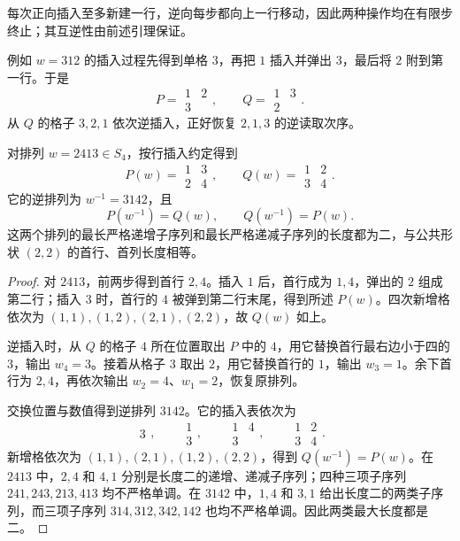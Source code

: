 每次正向插入至多新建一行，逆向每步都向上一行移动，因此两种操作均在有限步终止；其互逆性由前述引理保证。

例如 \(w=312\) 的插入过程先得到单格 \(3\)，再把 \(1\) 插入并弹出 \(3\)，最后将 \(2\) 附到第一行。于是
\[
	P=\begin{array}{cc}1&2\\3&\end{array},
	\qquad
	Q=\begin{array}{cc}1&3\\2&\end{array}.
\]
从 \(Q\) 的格子 \(3,2,1\) 依次逆插入，正好恢复 \(2,1,3\) 的逆读取次序。

\begin{proposition}\label{b5:prop:A-rs-2413}
	对排列 \(w=2413\in S_4\)，按行插入约定得到
	\[
		P(w)=\begin{array}{cc}1&3\\2&4\end{array},
		\qquad
		Q(w)=\begin{array}{cc}1&2\\3&4\end{array}.
	\]
	它的逆排列为 \(w^{-1}=3142\)，且
	\[
		P(w^{-1})=Q(w),\qquad Q(w^{-1})=P(w).
	\]
	这两个排列的最长严格递增子序列和最长严格递减子序列的长度都为二，与公共形状 \((2,2)\) 的首行、首列长度相等。
\end{proposition}
\begin{proof}
	对 \(2413\)，前两步得到首行 \(2,4\)。插入 \(1\) 后，首行成为 \(1,4\)，弹出的 \(2\) 组成第二行；插入 \(3\) 时，首行的 \(4\) 被弹到第二行末尾，得到所述 \(P(w)\)。四次新增格依次为 \((1,1),(1,2),(2,1),(2,2)\)，故 \(Q(w)\) 如上。

	逆插入时，从 \(Q\) 的格子 \(4\) 所在位置取出 \(P\) 中的 \(4\)，用它替换首行最右边小于四的 \(3\)，输出 \(w_4=3\)。接着从格子 \(3\) 取出 \(2\)，用它替换首行的 \(1\)，输出 \(w_3=1\)。余下首行为 \(2,4\)，再依次输出 \(w_2=4\)、\(w_1=2\)，恢复原排列。

	交换位置与数值得到逆排列 \(3142\)。它的插入表依次为
	\[
		\begin{array}{c}3\end{array},\qquad
		\begin{array}{c}1\\3\end{array},\qquad
		\begin{array}{cc}1&4\\3&\end{array},\qquad
		\begin{array}{cc}1&2\\3&4\end{array}.
	\]
	新增格依次为 \((1,1),(2,1),(1,2),(2,2)\)，得到 \(Q(w^{-1})=P(w)\)。在 \(2413\) 中，\(2,4\) 和 \(4,1\) 分别是长度二的递增、递减子序列；四种三项子序列 \(241,243,213,413\) 均不严格单调。在 \(3142\) 中，\(1,4\) 和 \(3,1\) 给出长度二的两类子序列，而三项子序列 \(314,312,342,142\) 也均不严格单调。因此两类最大长度都是二。
\end{proof}

